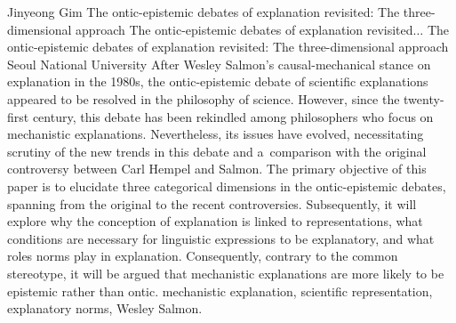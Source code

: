 \begin{artengenv}{Jinyeong Gim}
	{The ontic-epistemic debates of explanation revisited: The three-dimensional approach}
	{The ontic-epistemic debates of explanation revisited$\ldots$}
	{The ontic-epistemic debates of explanation revisited: The three-di\-men\-sional approach}
	{Seoul National University}
	{After Wesley Salmon's causal-mechanical stance on explanation in the 1980s, the ontic-epistemic debate of scientific explanations appeared to be resolved in the philosophy of science. However, since the twenty-first century, this debate has been rekindled among philosophers who focus on mechanistic explanations. Nevertheless, its issues have evolved, necessitating scrutiny of the new trends in this debate and a~comparison with the original controversy between Carl Hempel and Salmon. The primary objective of this paper is to elucidate three categorical dimensions in the ontic-epistemic debates, spanning from the original to the recent controversies. Subsequently, it will explore why the conception of explanation is linked to representations, what conditions are necessary for linguistic expressions to be explanatory, and what roles norms play in explanation. Consequently, contrary to the common stereotype, it will be argued that mechanistic explanations are more likely to be epistemic rather than ontic.
	}
	{mechanistic explanation, scientific representation, explanatory norms, Wesley Salmon.}







\end{artengenv}
